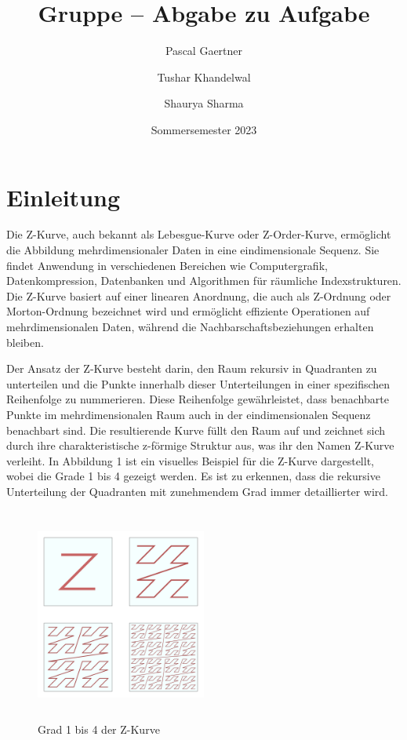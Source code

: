 \documentclass[course=erap]{aspdoc}
\author{Pascal Gaertner\and Tushar Khandelwal\and Shaurya Sharma}
\date{Sommersemester 2023}
\title{Gruppe \theGroup{} -- Abgabe zu Aufgabe \theNumber}
\begin{document}
\maketitle

\section{Einleitung}

\setlength{\parskip}{1em}
\noindent Die Z-Kurve, auch bekannt als Lebesgue-Kurve oder Z-Order-Kurve, ermöglicht die Abbildung mehrdimensionaler Daten in eine eindimensionale Sequenz. Sie findet Anwendung in verschiedenen Bereichen wie Computergrafik, Datenkompression, Datenbanken und Algorithmen für räumliche Indexstrukturen. Die Z-Kurve basiert auf einer linearen Anordnung, die auch als Z-Ordnung oder Morton-Ordnung bezeichnet wird und ermöglicht effiziente Operationen auf mehrdimensionalen Daten, während die Nachbarschaftsbeziehungen erhalten bleiben.
\setlength{\parskip}{1em}

\noindent Der Ansatz der Z-Kurve besteht darin, den Raum rekursiv in Quadranten zu unterteilen und die Punkte innerhalb dieser Unterteilungen in einer spezifischen Reihenfolge zu nummerieren. Diese Reihenfolge gewährleistet, dass benachbarte Punkte im mehrdimensionalen Raum auch in der eindimensionalen Sequenz benachbart sind. Die resultierende Kurve füllt den Raum auf und zeichnet sich durch ihre charakteristische z-förmige Struktur aus, was ihr den Namen Z-Kurve verleiht. In Abbildung 1 ist ein visuelles Beispiel für die Z-Kurve dargestellt, wobei die Grade 1 bis 4 gezeigt werden. Es ist zu erkennen, dass die rekursive Unterteilung der Quadranten mit zunehmendem Grad immer detaillierter wird.
\setlength{\parskip}{1em}

\begin{figure}[H]
        \centering
        \includegraphics[width=0.5\textwidth, height=7cm]{Z-Curve Degree 1 to 4.png}
        \caption{Grad 1 bis 4 der Z-Kurve}
        \label{fig:Z-Curve Degree 1 to 4}
\end{figure}
\end{document}
